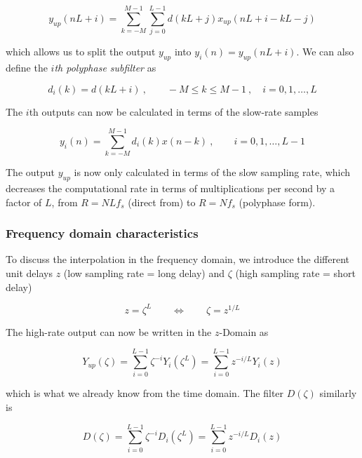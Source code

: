 \begin{equation*}
	y_{up}(nL+i) = \sum\limits_{k=-M}^{M-1}\sum\limits_{j=0}^{L-1} d(kL+j) x_{up}(nL+i-kL-j)
\end{equation*}

which allows us to split the output $y_{up}$ into $y_i(n)=y_{up}(nL+i)$.
We can also define the \emph{$i$th polyphase subfilter} as

\begin{equation*}
	d_i(k) = d(kL+i) \:,\qquad -M \leq k \leq M-1 \:,\quad i=0,1,\ldots,L
\end{equation*}

The $i$th outputs can now be calculated in terms of the slow-rate samples

\begin{equation*}
	y_i(n) = \sum\limits_{k=-M}^{M-1}d_i(k) x(n-k) \:,\qquad i=0,1,\ldots,L-1
\end{equation*}

The output $y_{up}$ is now only calculated in terms of the slow sampling rate,
which decreases the computational rate in terms of multiplications per second by
a factor of $L$, from $R = NLf_s$ (direct from) to $R = Nf_s$ (polyphase form).


\subsubsection{Frequency domain characteristics}
To discuss the interpolation in the frequency domain, we introduce the different
unit delays $z$ (low sampling rate = long delay) and $\zeta$
(high sampling rate = short delay)

\begin{equation*}
	z = \zeta^L \qquad \Leftrightarrow \qquad \zeta = z^{1/L}
\end{equation*}

The high-rate output can now be written in the $z$-Domain as

\begin{equation*}
	Y_{up}(\zeta) = \sum\limits_{i=0}^{L-1} \zeta^{-i} Y_i(\zeta^L)
	= \sum\limits_{i=0}^{L-1} z^{-i/L} Y_i(z)
\end{equation*}

which is what we already know from the time domain. The filter $D(\zeta)$
similarly is

\begin{equation*}
	D(\zeta) = \sum\limits_{i=0}^{L-1} \zeta^{-i} D_i(\zeta^L)
	= \sum\limits_{i=0}^{L-1} z^{-i/L} D_i(z)
\end{equation*}

